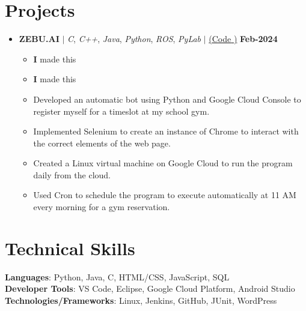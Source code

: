 \documentclass[letterpaper,5pt]{article}
\newcommand{\smalltextbullet}{\,\begin{picture}(-1,1)(-1,-3)\circle*{3}\end{picture}\ }
\begin{document}
      \section{\textbf{Projects}}
      \begin{itemize}[leftmargin=0in, label={}]
      
        \item[]
        \textbf{ZEBU.AI} $|$ \emph{C}, \emph{C++}, \emph{Java}, \emph{Python}, \emph{ROS}, \emph{PyLab} $|$ \href{link} {({Code} \faExternalLink)}
        \hfill \textbf{Feb-2024}
        \begin{itemize}
            \vspace*{-2mm}
            \item[\textbullet{}]\textbf{I} made this 
            \item[\textbullet{}]\textbf{I} made this     
            \item[\smalltextbullet] Developed an automatic bot using Python and Google Cloud Console to register myself for a timeslot at my school gym.
            \item[\smalltextbullet] Implemented Selenium to create an instance of Chrome to interact with the correct elements of the web page.
            \item[\smalltextbullet] Created a Linux virtual machine on Google Cloud to run the program daily from the cloud.
            \item[\smalltextbullet] Used Cron to schedule the program to execute automatically at 11 AM every morning for a gym reservation.
        \end{itemize}
        \vspace{-3mm}

        
    
    \end{itemize}
    \vspace{-15pt}
    
    \section{\textbf{Technical Skills}}
    \begin{itemize}[leftmargin=0.15in, label={}]
        \small{\item{
            \textbf{Languages}{: Python, Java, C, HTML/CSS, JavaScript, SQL} \\
            \textbf{Developer Tools}{: VS Code, Eclipse, Google Cloud Platform, Android Studio} \\
            \textbf{Technologies/Frameworks}{: Linux, Jenkins, GitHub, JUnit, WordPress} \\
        }}
    \end{itemize}
    \vspace{-16pt}
    
\end{document}
